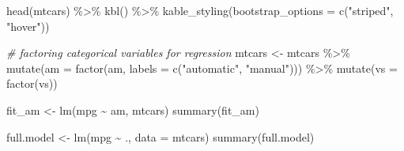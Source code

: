 \documentclass[
]{article}
\newenvironment{Shaded}{\begin{snugshade}}{\end{snugshade}}
\newcommand{\AttributeTok}[1]{\textcolor[rgb]{0.77,0.63,0.00}{#1}}
\newcommand{\CommentTok}[1]{\textcolor[rgb]{0.56,0.35,0.01}{\textit{#1}}}
\newcommand{\FunctionTok}[1]{\textcolor[rgb]{0.00,0.00,0.00}{#1}}
\newcommand{\NormalTok}[1]{#1}
\newcommand{\OtherTok}[1]{\textcolor[rgb]{0.56,0.35,0.01}{#1}}
\newcommand{\SpecialCharTok}[1]{\textcolor[rgb]{0.00,0.00,0.00}{#1}}
\newcommand{\StringTok}[1]{\textcolor[rgb]{0.31,0.60,0.02}{#1}}
\begin{document}
\begin{Shaded}
\begin{Highlighting}[]
\FunctionTok{head}\NormalTok{(mtcars) }\SpecialCharTok{\%\textgreater{}\%}
  \FunctionTok{kbl}\NormalTok{() }\SpecialCharTok{\%\textgreater{}\%}
  \FunctionTok{kable\_styling}\NormalTok{(}\AttributeTok{bootstrap\_options =} \FunctionTok{c}\NormalTok{(}\StringTok{"striped"}\NormalTok{, }\StringTok{"hover"}\NormalTok{))}
\end{Highlighting}
\end{Shaded}

\begin{Shaded}
\begin{Highlighting}[]
\CommentTok{\# factoring categorical variables for regression}
\NormalTok{mtcars }\OtherTok{\textless{}{-}}\NormalTok{ mtcars }\SpecialCharTok{\%\textgreater{}\%}
    \FunctionTok{mutate}\NormalTok{(}\AttributeTok{am =} \FunctionTok{factor}\NormalTok{(am, }\AttributeTok{labels =} \FunctionTok{c}\NormalTok{(}\StringTok{"automatic"}\NormalTok{, }\StringTok{"manual"}\NormalTok{))) }\SpecialCharTok{\%\textgreater{}\%}
    \FunctionTok{mutate}\NormalTok{(}\AttributeTok{vs =} \FunctionTok{factor}\NormalTok{(vs))}
\end{Highlighting}
\end{Shaded}

\begin{Shaded}
\end{Shaded}

\begin{Shaded}
\begin{Highlighting}[]
\NormalTok{fit\_am }\OtherTok{\textless{}{-}} \FunctionTok{lm}\NormalTok{(mpg }\SpecialCharTok{\textasciitilde{}}\NormalTok{ am, mtcars)}
\FunctionTok{summary}\NormalTok{(fit\_am) }
\end{Highlighting}
\end{Shaded}

\begin{Shaded}
\begin{Highlighting}[]
\NormalTok{full.model }\OtherTok{\textless{}{-}} \FunctionTok{lm}\NormalTok{(mpg }\SpecialCharTok{\textasciitilde{}}\NormalTok{ ., }\AttributeTok{data =}\NormalTok{ mtcars)}
\FunctionTok{summary}\NormalTok{(full.model) }
\end{Highlighting}
\end{Shaded}
\end{document}
